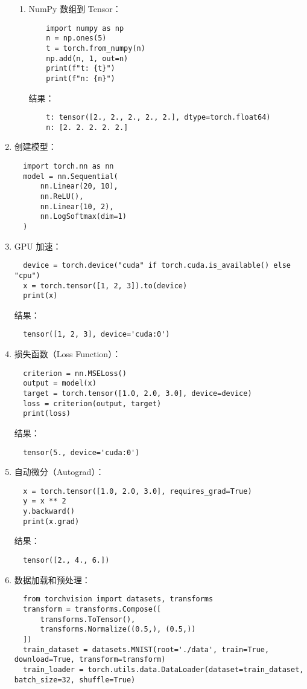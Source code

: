 \documentclass[UTF8]{ctexart}
\begin{document}
\begin{enumerate}
\begin{enumerate}
    \item NumPy 数组到 Tensor：
    \begin{verbatim}
    import numpy as np
    n = np.ones(5)
    t = torch.from_numpy(n)
    np.add(n, 1, out=n)
    print(f"t: {t}")
    print(f"n: {n}")
    \end{verbatim}
    结果：
    \begin{verbatim}
    t: tensor([2., 2., 2., 2., 2.], dtype=torch.float64)
    n: [2. 2. 2. 2. 2.]
    \end{verbatim}
  \end{enumerate}
  
  \item 创建模型：
  \begin{verbatim}
  import torch.nn as nn
  model = nn.Sequential(
      nn.Linear(20, 10),
      nn.ReLU(),
      nn.Linear(10, 2),
      nn.LogSoftmax(dim=1)
  )
  \end{verbatim}
  
  \item GPU 加速：
  \begin{verbatim}
  device = torch.device("cuda" if torch.cuda.is_available() else "cpu")
  x = torch.tensor([1, 2, 3]).to(device)
  print(x)
  \end{verbatim}
  结果：
  \begin{verbatim}
  tensor([1, 2, 3], device='cuda:0')
  \end{verbatim}
  
  \item 损失函数（Loss Function）：
  \begin{verbatim}
  criterion = nn.MSELoss()
  output = model(x)
  target = torch.tensor([1.0, 2.0, 3.0], device=device)
  loss = criterion(output, target)
  print(loss)
  \end{verbatim}
  结果：
  \begin{verbatim}
  tensor(5., device='cuda:0')
  \end{verbatim}
  
  \item 自动微分（Autograd）：
  \begin{verbatim}
  x = torch.tensor([1.0, 2.0, 3.0], requires_grad=True)
  y = x ** 2
  y.backward()
  print(x.grad)
  \end{verbatim}
  结果：
  \begin{verbatim}
  tensor([2., 4., 6.])
  \end{verbatim}
  
  \item 数据加载和预处理：
  \begin{verbatim}
  from torchvision import datasets, transforms
  transform = transforms.Compose([
      transforms.ToTensor(),
      transforms.Normalize((0.5,), (0.5,))
  ])
  train_dataset = datasets.MNIST(root='./data', train=True, download=True, transform=transform)
  train_loader = torch.utils.data.DataLoader(dataset=train_dataset, batch_size=32, shuffle=True)
  \end{verbatim}
  

\end{enumerate}
\end{document}
